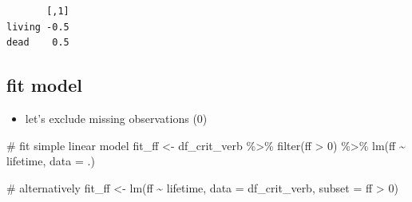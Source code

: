 \documentclass[
  letterpaper,
  DIV=11,
  numbers=noendperiod]{scrartcl}
\newenvironment{Shaded}{\begin{snugshade}}{\end{snugshade}}
\newcommand{\AttributeTok}[1]{\textcolor[rgb]{0.40,0.45,0.13}{#1}}
\newcommand{\CommentTok}[1]{\textcolor[rgb]{0.37,0.37,0.37}{#1}}
\newcommand{\DecValTok}[1]{\textcolor[rgb]{0.68,0.00,0.00}{#1}}
\newcommand{\FloatTok}[1]{\textcolor[rgb]{0.68,0.00,0.00}{#1}}
\newcommand{\FunctionTok}[1]{\textcolor[rgb]{0.28,0.35,0.67}{#1}}
\newcommand{\NormalTok}[1]{\textcolor[rgb]{0.00,0.23,0.31}{#1}}
\newcommand{\OtherTok}[1]{\textcolor[rgb]{0.00,0.23,0.31}{#1}}
\newcommand{\SpecialCharTok}[1]{\textcolor[rgb]{0.37,0.37,0.37}{#1}}
\newcommand{\StringTok}[1]{\textcolor[rgb]{0.13,0.47,0.30}{#1}}
\providecommand{\tightlist}{%
  \setlength{\itemsep}{0pt}\setlength{\parskip}{0pt}}\usepackage{longtable,booktabs,array}
\begin{document}
\begin{Shaded}
\end{Shaded}

\begin{verbatim}
       [,1]
living -0.5
dead    0.5
\end{verbatim}

\hypertarget{fit-model}{%
\subsection{fit model}\label{fit-model}}

\begin{itemize}
\tightlist
\item
  let's exclude missing observations (0)
\end{itemize}

\begin{Shaded}
\begin{Highlighting}[]
\CommentTok{\# fit simple linear model}
\NormalTok{fit\_ff }\OtherTok{\textless{}{-}}\NormalTok{ df\_crit\_verb }\SpecialCharTok{\%\textgreater{}\%}
  \FunctionTok{filter}\NormalTok{(ff }\SpecialCharTok{\textgreater{}} \DecValTok{0}\NormalTok{) }\SpecialCharTok{\%\textgreater{}\%}
  \FunctionTok{lm}\NormalTok{(ff }\SpecialCharTok{\textasciitilde{}}\NormalTok{ lifetime, }\AttributeTok{data =}\NormalTok{ .)}
\end{Highlighting}
\end{Shaded}

\begin{Shaded}
\begin{Highlighting}[]
\CommentTok{\# alternatively}
\NormalTok{fit\_ff }\OtherTok{\textless{}{-}} \FunctionTok{lm}\NormalTok{(ff }\SpecialCharTok{\textasciitilde{}}\NormalTok{ lifetime, }
            \AttributeTok{data =}\NormalTok{ df\_crit\_verb, }\AttributeTok{subset =}\NormalTok{ ff }\SpecialCharTok{\textgreater{}} \DecValTok{0}\NormalTok{)}
\end{Highlighting}
\end{Shaded}
\end{document}
